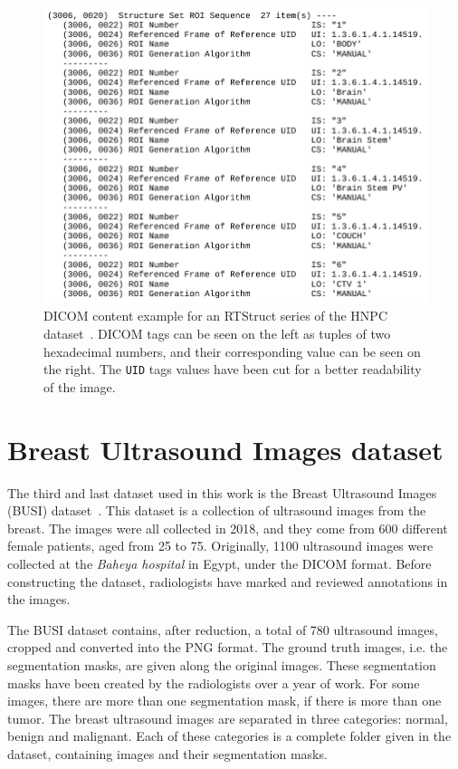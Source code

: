 \begin{figure}[t!]
  \centering
  \includegraphics[width=\textwidth]{figures/datasets/hn_structsetroi.pdf}
  \caption[RTStruct DICOM content]{DICOM content example for an RTStruct series of the HNPC dataset~\cite{vallieres_data_2017}. DICOM tags can be seen on the left as tuples of two hexadecimal numbers, and their corresponding value can be seen on the right. The \texttt{UID} tags values have been cut for a better readability of the image.}
  \label{fig:hnpc_structset}
\end{figure}

\newpage
\section{Breast Ultrasound Images dataset}
The third and last dataset used in this work is the Breast Ultrasound Images (BUSI) dataset~\cite{al-dhabyani_dataset_2020}. This dataset is a collection of ultrasound images from the breast. The images were all collected in 2018, and they come from 600 different female patients, aged from 25 to 75. Originally, 1100 ultrasound images were collected at the \emph{Baheya hospital} in Egypt, under the DICOM format. Before constructing the dataset, radiologists have marked and reviewed annotations in the images.

The BUSI dataset contains, after reduction, a total of 780 ultrasound images, cropped and converted into the PNG format. The ground truth images, i.e. the segmentation masks, are given along the original images. These segmentation masks have been created by the radiologists over a year of work. For some images, there are more than one segmentation mask, if there is more than one tumor. The breast ultrasound images are separated in three categories: normal, benign and malignant. Each of these categories is a complete folder given in the dataset, containing images and their segmentation masks.
